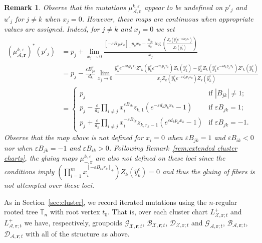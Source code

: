 \documentclass{amsart}
\newtheorem{remark}[theorem]{Remark}
\numberwithin{equation}{section}
\newcommand{\bfr}{{\boldsymbol{r}}}
\newcommand{\cA}{\mathcal{A}}
\newcommand{\cB}{\mathcal{B}}
\newcommand{\cD}{\mathcal{D}}
\newcommand{\cG}{\mathcal{G}}
\newcommand{\cX}{\mathcal{X}}
\newcommand{\TT}{\mathbb{T}}
\begin{document}
\begin{remark}
  Observe that the mutations $\mu_{\cA,\bfr}^{k,\varepsilon}$ appear to be undefined on $p'_j$ and $u'_j$ for $j\ne k$ when $x_j=0$.
  However, these maps are continuous when appropriate values are assigned.
  Indeed, for $j\ne k$ and $x_j=0$ we set
  \begin{align*}
    (\mu_{\cA,\bfr}^{k,\varepsilon})^*(p'_j)
    &=p_j+\lim_{x_j \to 0}\frac{[-\varepsilon B_{jk} r_k]_+ p_k x_k - \frac{B_{jk}}{d_k}\log\left(\frac{Z_k(\hat y_k^\varepsilon e^{-\varepsilon d_kp_kx_k})}{Z_k(\hat y_k^\varepsilon)}\right)}{x_j}\\
    &=p_j-\frac{\varepsilon B_{jk}^2}{d_k} \lim_{x_j\to 0} \frac{ \hat y_k^\varepsilon e^{-\varepsilon d_kp_kx_k} Z'_k(\hat y_k^\varepsilon e^{-\varepsilon d_kp_kx_k}) Z_k(\hat y_k^\varepsilon) - \hat y_k^\varepsilon Z_k(\hat y_k^\varepsilon e^{-\varepsilon d_kp_kx_k}) Z'_k(\hat y_k^\varepsilon) }{ x_j Z_k(\hat y_k^\varepsilon e^{-\varepsilon d_kp_kx_k}) Z_k(\hat y_k^\varepsilon) }\\
    &=\begin{cases} 
      p_j & \text{if $|B_{jk}| \ne 1$;}\\ 
      p_j - \frac{\varepsilon}{d_k} \prod_{i\ne j} x_i^{\varepsilon B_{ik}} z_{k,1} (e^{-\varepsilon d_kp_kx_k} - 1) & \text{if $\varepsilon B_{jk} = 1$;}\\ 
      p_j + \frac{\varepsilon}{d_k} \prod_{i\ne j} x_i^{-\varepsilon B_{ik}} z_{k,r_k-1} (e^{\varepsilon d_kp_kx_k} - 1) & \text{if $\varepsilon B_{jk} = -1$.}
    \end{cases}
  \end{align*}
  Observe that the map above is not defined for $x_i=0$ when $\varepsilon B_{jk}=1$ and $\varepsilon B_{ik} < 0$ nor when $\varepsilon B_{jk} = -1$ and $\varepsilon B_{ik} > 0$.
  Following Remark~\ref{rem:extended cluster charts}, the gluing maps $\mu_{-,\bfr}^{k,\varepsilon}$ are also not defined on these loci since the conditions imply $\left(\prod\limits_{i=1}^m x_i^{[-\varepsilon B_{ik}r_k]_+}\right)Z_k(\hat y_k^\varepsilon)=0$ and thus the gluing of fibers is not attempted over these loci. 
\end{remark}

As in Section~\ref{sec:cluster}, we record iterated mutations using the $n$-regular rooted tree $\TT_n$ with root vertex $t_0$.
That is, over each cluster chart $L^+_{\cX,\bfr;t}$ and $L^+_{\cA,\bfr;t}$ we have, respectively, groupoids $\cG_{\cX,\bfr;t}$, $\cB_{\cX,\bfr;t}$, $\cD_{\cX,\bfr;t}$ and $\cG_{\cA,\bfr;t}$, $\cB_{\cA,\bfr;t}$, $\cD_{\cA,\bfr;t}$ with all of the structure as above.
\end{document}
